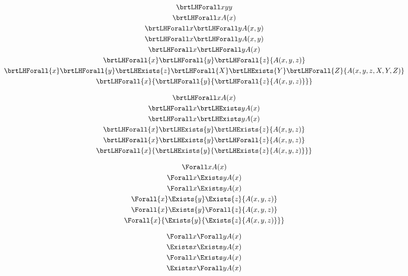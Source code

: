 \documentclass{article}
\begin{document}
    \ExplSyntaxOn

    \begin{gather}
        \brtLHForall x {yy}
        \\
        \brtLHForall x {A(x)}
        \\
        \brtLHForall x \brtLHForall y {A(x,y)}
        \\
        \brtLHForall x {\brtLHForall y {A(x,y)}}
        \\
        \brtLHForall x {\brtLHForall y {A(x)}}
        \\
        \brtLHForall {x} \brtLHForall {y} \brtLHForall {z} {A(x,y,z)}
        \\
        \brtLHForall {x} \brtLHForall {y} \brtLHExists {z}
        \brtLHForall {X} \brtLHExists {Y} \brtLHForall {Z}
        {A(x,y,z,X,Y,Z)}
        \\
        \brtLHForall {x} { \brtLHForall {y} {\brtLHForall {z} {A(x,y,z)} }}
    \end{gather}

    \begin{gather}
        \brtLHForall x {A(x)}
        \\
        \brtLHForall x \brtLHExists y {A(x)}
        \\
        \brtLHForall x {\brtLHExists y {A(x)}}
        \\
        \brtLHForall {x} \brtLHExists {y} \brtLHExists {z} {A(x,y,z)}
        \\
        \brtLHForall {x} \brtLHExists {y} \brtLHForall {z} {A(x,y,z)}
        \\
        \brtLHForall {x} { \brtLHExists {y} {\brtLHExists {z} {A(x,y,z)} }}
    \end{gather}

    \begin{gather}
        \Forall x {A(x)}
        \\
        \Forall x \Exists y {A(x)}
        \\
        \Forall x {\Exists y {A(x)}}
        \\
        \Forall {x} \Exists {y} \Exists {z} {A(x,y,z)}
        \\
        \Forall {x} \Exists {y} \Forall {z} {A(x,y,z)}
        \\
        \Forall {x} { \Exists {y} {\Exists {z} {A(x,y,z)} }}
    \end{gather}

    \begin{gather}
        \Forall x \Forall y {A(x)}
        \\
        \Exists x \Exists y {A(x)}
        \\
        \Forall x \Exists y {A(x)}
        \\
        \Exists x \Forall y {A(x)}
    \end{gather}

    \ExplSyntaxOff
\end{document}
